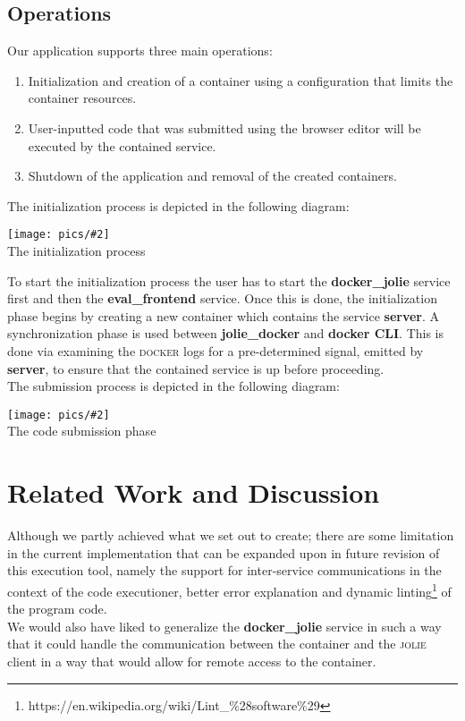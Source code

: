 \documentclass[12pt]{article}
\newcommand{\img}[3] {
	\begin{center}
	\texttt{[image: pics/\#2]}\\
	{\small #3}
	\end{center}
}
\newcommand{\docker}[0] {\textsc{docker}}
\newcommand{\jolie}[0] {\textsc{jolie}}
\begin{document}
\subsection{Operations}
Our application supports three main operations:
\begin{enumerate}
\item Initialization and creation of a container using a configuration that limits the container resources.
\item User-inputted code that was submitted using the browser editor will be executed by the contained service.
\item Shutdown of the application and removal of the created containers.
\end{enumerate}
The initialization process is depicted in the following diagram:
\img{0.7}{init}{The initialization process}
To start the initialization process the user has to start the \textbf{docker\_jolie} service first and then the \textbf{eval\_frontend} service. Once this is done, the initialization phase begins by creating a new container which contains the service \textbf{server}. A synchronization phase is used between \textbf{jolie\_docker} and \textbf{docker CLI}. This is done via examining the \docker{} logs for a pre-determined signal, emitted by \textbf{server}, to ensure that the contained service is up before proceeding.\\

\noindent{}The submission process is depicted in the following diagram:
\img{0.7}{submit}{The code submission phase}


\section{Related Work and Discussion}

Although we partly achieved what we set out to create; there are some limitation in the current implementation that can be expanded upon in future revision of this execution tool, namely the support for inter-service communications in the context of the code executioner, better error explanation and dynamic linting\footnote{https://en.wikipedia.org/wiki/Lint\_\%28software\%29} of the program code.\\

\noindent{}We would also have liked to generalize the \textbf{docker\_jolie} service in such a way that it could handle the communication between the container and the \jolie{} client in a way that would allow for remote access to the container.

 

\end{document}
